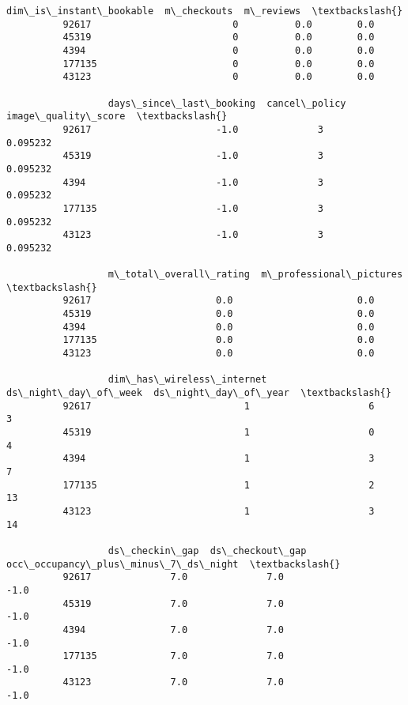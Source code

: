 \documentclass[11pt]{article}
\begin{document}
\begin{Verbatim}[commandchars=\\\{\}]
                  dim\_is\_instant\_bookable  m\_checkouts  m\_reviews  \textbackslash{}
          92617                         0          0.0        0.0   
          45319                         0          0.0        0.0   
          4394                          0          0.0        0.0   
          177135                        0          0.0        0.0   
          43123                         0          0.0        0.0   
          
                  days\_since\_last\_booking  cancel\_policy  image\_quality\_score  \textbackslash{}
          92617                      -1.0              3             0.095232   
          45319                      -1.0              3             0.095232   
          4394                       -1.0              3             0.095232   
          177135                     -1.0              3             0.095232   
          43123                      -1.0              3             0.095232   
          
                  m\_total\_overall\_rating  m\_professional\_pictures  \textbackslash{}
          92617                      0.0                      0.0   
          45319                      0.0                      0.0   
          4394                       0.0                      0.0   
          177135                     0.0                      0.0   
          43123                      0.0                      0.0   
          
                  dim\_has\_wireless\_internet  ds\_night\_day\_of\_week  ds\_night\_day\_of\_year  \textbackslash{}
          92617                           1                     6                     3   
          45319                           1                     0                     4   
          4394                            1                     3                     7   
          177135                          1                     2                    13   
          43123                           1                     3                    14   
          
                  ds\_checkin\_gap  ds\_checkout\_gap  occ\_occupancy\_plus\_minus\_7\_ds\_night  \textbackslash{}
          92617              7.0              7.0                                 -1.0   
          45319              7.0              7.0                                 -1.0   
          4394               7.0              7.0                                 -1.0   
          177135             7.0              7.0                                 -1.0   
          43123              7.0              7.0                                 -1.0   
          

\end{Verbatim}
\end{document}
